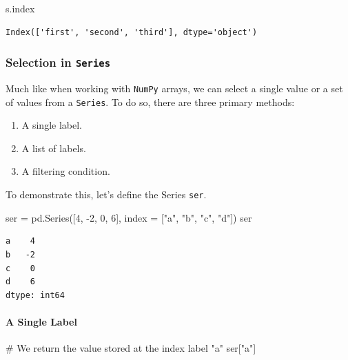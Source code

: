 \documentclass[
  letterpaper,
  DIV=11,
  numbers=noendperiod]{scrreprt}
\let\oldparagraph\paragraph
\renewcommand{\paragraph}[1]{\oldparagraph{#1}\mbox{}}
\newenvironment{Shaded}{\begin{snugshade}}{\end{snugshade}}
\newcommand{\CommentTok}[1]{\textcolor[rgb]{0.37,0.37,0.37}{#1}}
\newcommand{\DecValTok}[1]{\textcolor[rgb]{0.68,0.00,0.00}{#1}}
\newcommand{\NormalTok}[1]{\textcolor[rgb]{0.00,0.23,0.31}{#1}}
\newcommand{\OperatorTok}[1]{\textcolor[rgb]{0.37,0.37,0.37}{#1}}
\newcommand{\StringTok}[1]{\textcolor[rgb]{0.13,0.47,0.30}{#1}}
\providecommand{\tightlist}{%
  \setlength{\itemsep}{0pt}\setlength{\parskip}{0pt}}\usepackage{longtable,booktabs,array}
\begin{document}
\begin{Shaded}
\begin{Highlighting}[]
\NormalTok{s.index}
\end{Highlighting}
\end{Shaded}

\begin{verbatim}
Index(['first', 'second', 'third'], dtype='object')
\end{verbatim}

\subsubsection{\texorpdfstring{Selection in
\texttt{Series}}{Selection in Series}}\label{selection-in-series}

Much like when working with \texttt{NumPy} arrays, we can select a
single value or a set of values from a \texttt{Series}. To do so, there
are three primary methods:

\begin{enumerate}
\def\labelenumi{\arabic{enumi}.}
\tightlist
\item
  A single label.
\item
  A list of labels.
\item
  A filtering condition.
\end{enumerate}

To demonstrate this, let's define the Series \texttt{ser}.

\begin{Shaded}
\begin{Highlighting}[]
\NormalTok{ser }\OperatorTok{=}\NormalTok{ pd.Series([}\DecValTok{4}\NormalTok{, }\OperatorTok{{-}}\DecValTok{2}\NormalTok{, }\DecValTok{0}\NormalTok{, }\DecValTok{6}\NormalTok{], index }\OperatorTok{=}\NormalTok{ [}\StringTok{"a"}\NormalTok{, }\StringTok{"b"}\NormalTok{, }\StringTok{"c"}\NormalTok{, }\StringTok{"d"}\NormalTok{])}
\NormalTok{ser}
\end{Highlighting}
\end{Shaded}

\begin{verbatim}
a    4
b   -2
c    0
d    6
dtype: int64
\end{verbatim}

\paragraph{A Single Label}\label{a-single-label}

\begin{Shaded}
\begin{Highlighting}[]
\CommentTok{\# We return the value stored at the index label "a"}
\NormalTok{ser[}\StringTok{"a"}\NormalTok{] }
\end{Highlighting}
\end{Shaded}
\end{document}
